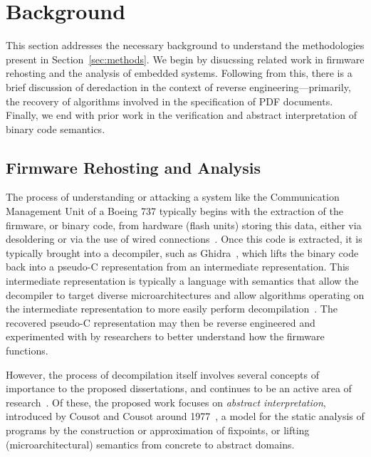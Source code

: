 \section{Background}
This section addresses the necessary background to understand the methodologies present in Section~\ref{sec:methods}. 
We begin by disucssing related work in firmware rehosting and the analysis of embedded systems.
Following from this, there is a brief discussion of deredaction in the context of reverse engineering---primarily, the recovery of algorithms involved in the specification of PDF documents.
Finally, we end with prior work in the verification and abstract interpretation of binary code semantics.

\subsection{Firmware Rehosting and Analysis}

The process of understanding or attacking a system like the Communication Management Unit of a Boeing 737 typically begins with the extraction of the firmware, or binary code, from hardware (flash units) storing this data, either via desoldering or via the use of wired connections~\cite{milburn2018there}.
Once this code is extracted, it is typically brought into a decompiler, such as Ghidra~\cite{eagle2020ghidra}, which lifts the binary code back into a pseudo-C representation from an intermediate representation.
This intermediate representation is typically a language with semantics that allow the decompiler to target diverse microarchitectures and allow algorithms operating on the intermediate representation to more easily perform decompilation~\cite{cifuentes1995decompilation}.
The recovered pseudo-C representation may then be reverse engineered and experimented with by researchers to better understand how the firmware functions.

However, the process of decompilation itself involves several concepts of importance to the proposed dissertations, and continues to be an active area of research~\cite{chen2019survey}.
Of these, the proposed work focuses on \emph{abstract interpretation}, introduced by Cousot and Cousot around 1977~\cite{cousot1977abstract}, a model for the static analysis of programs by the construction or approximation of fixpoints, or lifting (microarchitectural) semantics from concrete to abstract domains.

